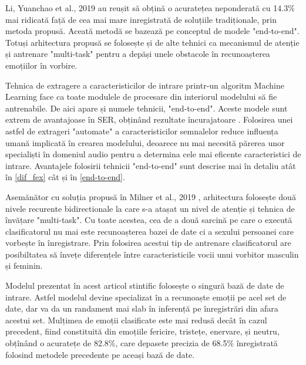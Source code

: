 \documentclass[a4paper,12pt]{book}
\begin{document}
					Li, Yuanchao et al., 2019 \cite{yuan} au reușit să obțină o acuratețea neponderată cu 14.3\% mai ridicată față de cea mai mare inregistrată de soluțiile tradiționale, prin metoda propusă. Aceată metodă se bazează pe conceptul de modele "end-to-end". Totuși arhitectura propusă se folosește și de alte tehnici ca mecanismul de atenție și antrenare "multi-task" pentru a depăși unele obstacole în recunoașterea emoțiilor în vorbire. \par
					
					Tehnica de extragere a caracteristicilor de intrare printr-un algoritm Machine Learning face ca toate modulele de procesare din interiorul modelului să fie antrenabile. De aici apare și numele tehnicii, "end-to-end". Aceste modele sunt extrem de avantajoase în SER, obținând rezultate încurajatoare \cite{adieu,e2e}. Folosirea unei astfel de extrageri "automate" a caracteristicilor semnalelor reduce influența umană implicată în crearea modelului, deoarece nu mai necesită părerea unor specialiști în domeniul audio pentru a determina cele mai eficente caracteristici de intrare. Avantajele folosirii tehnicii "end-to-end" sunt descrise mai în detaliu atât în \ref{dif_fex} cât și în \ref{end-to-end}. \par
					
					Asemănător cu soluția propusă în Milner et al., 2019 \cite{multi-domain}, arhitectura folosește două nivele recurente bidirectionale la care s-a atașat un nivel de atenție și tehnica de  învățare "multi-task". Cu toate acestea, cea de a două sarcină pe care o execută clasificatorul nu mai este recunoașterea bazei de date ci a sexului persoanei care vorbește în înregistrare. Prin folosirea acestui tip de antrenare clasificatorul are posibiltatea să învețe diferențele între caracteristicile vocii unui vorbitor masculin și feminin. \par
					
					Modelul prezentat în acest articol stintific folosește o singură bază de date de intrare. Astfel modelul devine specializat în a recunoaște emoții pe acel set de date, dar va da un randament mai slab în inferență pe înregistrări din afara acestui set. Mulțimea de emoții clasificate este mai redusă  decât în cazul precedent, fiind constituită din emoțiile fericire, tristețe, enervare, și neutru, obțînând o acuratețe de 82.8\%, care depasete precizia de 68.5\% înregistrată folosind metodele precedente pe aceași bază de date.
\end{document}
